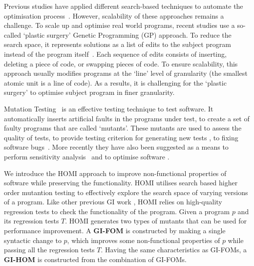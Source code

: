 \documentclass[oribibl]{llncs}
\begin{document}

Previous studies have applied different search-based techniques to automate the optimisation process~\cite{arcuri-ssbse-2011, 6035728,Brake:2008:ADS:1370018.1370031,hutter2009paramils}. However, scalability of these approaches remains a challenge. To scale up and optimise real world programs, recent studies use a so-called `plastic surgery' Genetic Programming (GP) approach. To reduce the search space, it represents solutions as a list of edits to the subject program instead of the program itself~\cite{Bruce:2015:REC:2739480.2754752,geneticimprovementJP}.
Each sequence of edits consists of inserting, deleting a piece of code, or swapping pieces of code.
To ensure scalability, this approach usually modifies programs at the `line' level of granularity (the smallest atomic unit is a line of code). As a results, it is challenging for the `plastic surgery' to optimise subject program in finer granularity. 


Mutation Testing~\cite{demillo1978hints,5487526} is an effective testing technique to test software. It automatically inserts artificial faults in the programs under test, to create a set of faulty programs that are called `mutants'. These mutants are used to assess the quality of tests, to provide testing criterion for generating new tests \cite{Harman:2011:SHO:2025113.2025144}, to fixing software bugs~\cite{6035728}. More recently they have also been suggested as a means to perform sensitivity analysis~\cite{Wu:2015:DPO:2739480.2754648} and to optimise software \cite{Jia:2015:GIU:2739482.2768417}.

We introduce the HOMI approach to improve non-functional properties of software while preserving the functionality. HOMI utilises search based higher order mutantion testing \cite{Harman:2014:AME:2642937.2643008} to effectively explore the search space of varying versions of a program. Like other previous GI work \cite{Langdon:2014:IMI:2576768.2598244, Bruce:2015:REC:2739480.2754752,geneticimprovementJP}, HOMI relies on high-quality regression tests to check the functionality of the program. Given a program $p$ and its regression tests $T$. HOMI generates two types of mutants that can be used for performance improvement. A \textbf{GI-FOM} is constructed by making a single syntactic change to $p$, which improves some non-functional properties of $p$ while passing all the regression tests $T$. Having the same characteristics as GI-FOMs, a \textbf{GI-HOM} is constructed from the combination of GI-FOMs.
\end{document}
